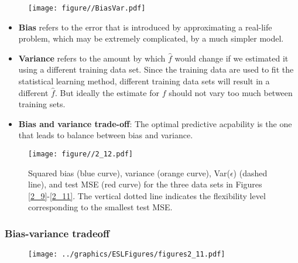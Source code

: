 \documentclass[10pt,a4paper]{beamer}
\begin{document}
\begin{frame}{}

\begin{figure}
  \centering
  \texttt{[image: figure//BiasVar.pdf]}\\
\end{figure}
\begin{itemize}
   \item \textbf{Bias} refers to the error that is introduced by approximating
a real-life problem, which may be extremely complicated, by a much
simpler model.
  \item \textbf{Variance} refers to the amount by which $\hat{f}$ would change if we
estimated it using a different training data set. Since the training data
are used to fit the statistical learning method, different training data sets
will result in a different $\hat{f}$. But ideally the estimate for $f$ should not vary
too much between training sets.
  \item \textbf{Bias and variance trade-off}: The optimal predictive acpability is the one that leads to balance between bias and variance.
\end{itemize}
\end{frame}


\begin{frame}{}

\begin{figure}
  \centering
  \texttt{[image: figure//2\_12.pdf]}\\
  \caption{Squared bias (blue curve), variance (orange curve), Var($\epsilon$)
(dashed line), and test MSE (red curve) for the three data sets in Figures \ref{2_9}-\ref{2_11}.
The vertical dotted line indicates the flexibility level corresponding to the smallest test MSE.}\label{}
\end{figure}

\end{frame}



    				\begin{frame}
     					\frametitle{Bias-variance tradeoff}
     					\begin{figure}[h]
     						\centering
     						\texttt{[image: ../graphics/ESLFigures/figures2\_11.pdf]}	 
     						
     					\end{figure}	
     				\end{frame}
\end{document}
